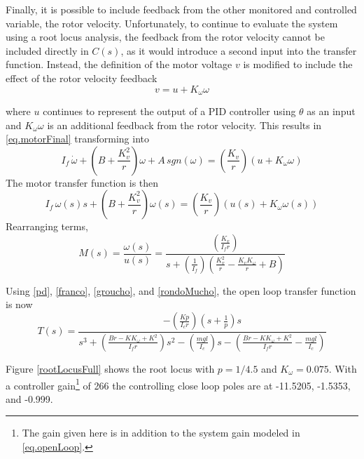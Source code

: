 \documentclass[12pt,letterpaper]{article}
\begin{document}
Finally, it is possible to include feedback from the other monitored and controlled variable, the rotor velocity.
Unfortunately, to continue to evaluate the system using a root locus analysis, the feedback from
the rotor velocity cannot be included directly in $C(s)$, as it would introduce a second input into the transfer function.  
Instead, the definition of the motor voltage $v$ is modified to include the effect of the rotor velocity feedback
\begin{equation}
    v = u + K_{\omega}\omega
\end{equation}

where $u$ continues to represent the output of a PID controller using $\theta$ as an input and $K_{\omega}\omega$ is an additional feedback
from the rotor velocity.
%
This results in \eqref{eq.motorFinal} transforming into
\begin{equation}
    I_{f} \, \dot{\omega} + \left( B+\frac{K_{v}^2}{r} \right) \omega +A \, sgn(\omega)= \left(\frac{K_{v}} {r}\right)(u + K_{\omega}\omega)
\end{equation}
The motor transfer function is then
\begin{equation}
    I_{f} \, \omega(s) s + \left( B+\frac{K_{v}^2}{r} \right) \omega(s) = \left(\frac{K_{v}} {r}\right)(u(s)+K_{\omega} \omega(s))
\end{equation}
Rearranging terms,
\begin{equation}
    M(s) = \frac{\omega(s)}{u(s)} =  \frac{\left(\frac{K_{v}} {I_{f}r}\right)}{s + (\frac{1}{I_{f}})(\frac{K_{v}^2}{r}-\frac{K_{v} K_{\omega}}{r}+B)}
    \label{rondoMucho}
\end{equation} 

Using \eqref{pd}, \eqref{franco}, \eqref{groucho}, and \eqref{rondoMucho}, the open loop transfer function is now
\begin{equation}
	T(s) =\frac{-(\frac{Kp} {I_{c}r})(s+\frac{1}{p})s}
	{s^3 + (\frac{B r-K K_{\omega}+K^2}{I_{f}r})s^2 - (\frac{m g l}{I_{c}})s - (\frac{Br-K K_{\omega}+K^2}{I_{f}r} - \frac{m g l}{I_{c}})}\label{eq.openLoop}
\end{equation}

Figure \ref{rootLocusFull} shows the root locus with $p = 1/4.5$ and $K_{\omega} = 0.075$.  With a controller gain\footnote{The gain given here is in addition to the system gain modeled in \eqref{eq.openLoop}. } of 266 the controlling close loop poles are at -11.5205, -1.5353, and -0.999.\\
\end{document}
